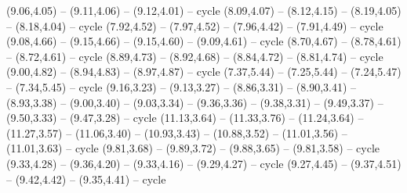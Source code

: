 {  (9.06,4.05) -- (9.11,4.06) -- (9.12,4.01) -- cycle
  (8.09,4.07) -- (8.12,4.15) -- (8.19,4.05) -- (8.18,4.04) -- cycle
  (7.92,4.52) -- (7.97,4.52) -- (7.96,4.42) -- (7.91,4.49) -- cycle
  (9.08,4.66) -- (9.15,4.66) -- (9.15,4.60) -- (9.09,4.61) -- cycle
  (8.70,4.67) -- (8.78,4.61) -- (8.72,4.61) -- cycle
  (8.89,4.73) -- (8.92,4.68) -- (8.84,4.72) -- (8.81,4.74) -- cycle
  (9.00,4.82) -- (8.94,4.83) -- (8.97,4.87) -- cycle
  (7.37,5.44) -- (7.25,5.44) -- (7.24,5.47) -- (7.34,5.45) -- cycle
  (9.16,3.23) -- (9.13,3.27) -- (8.86,3.31) -- (8.90,3.41) -- (8.93,3.38) -- (9.00,3.40) -- (9.03,3.34) -- (9.36,3.36) -- (9.38,3.31) -- (9.49,3.37) -- (9.50,3.33) -- (9.47,3.28) -- cycle
  (11.13,3.64) -- (11.33,3.76) -- (11.24,3.64) -- (11.27,3.57) -- (11.06,3.40) -- (10.93,3.43) -- (10.88,3.52) -- (11.01,3.56) -- (11.01,3.63) -- cycle
  (9.81,3.68) -- (9.89,3.72) -- (9.88,3.65) -- (9.81,3.58) -- cycle
  (9.33,4.28) -- (9.36,4.20) -- (9.33,4.16) -- (9.29,4.27) -- cycle
  (9.27,4.45) -- (9.37,4.51) -- (9.42,4.42) -- (9.35,4.41) -- cycle}

\providecommand\Provinzgrenzen[1]{\csname geo:Provinzgrenzen:#1\endcsname}
\def\ProvinzgrenzenListe{200}
\expandafter\def\csname geo:Provinzgrenzen:200\endcsname{
  }

